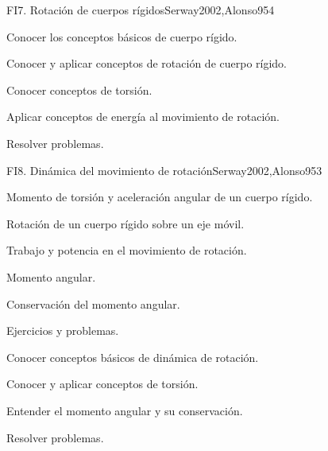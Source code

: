 \begin{sumilla}
\begin{unit}{FI7. Rotaci\'on de cuerpos r\'igidos}{Serway2002,Alonso95}{4}
   \begin{objetivos}
      \item Conocer los conceptos b\'asicos de cuerpo r\'igido.
      \item Conocer y aplicar conceptos de rotaci\'on de cuerpo r\'igido.
      \item Conocer conceptos de torsi\'on.
      \item Aplicar conceptos de energ\'ia al movimiento de rotaci\'on.
      \item Resolver problemas.
   \end{objetivos}
\end{unit}

\begin{unit}{FI8. Din\'amica del movimiento de rotaci\'on}{Serway2002,Alonso95}{3}
\begin{topicos}
      \item Momento de torsi\'on y aceleraci\'on angular de un cuerpo r\'igido.
      \item Rotaci\'on de un cuerpo r\'igido sobre un eje m\'ovil.
      \item Trabajo y potencia en el movimiento de rotaci\'on.
      \item Momento angular.
      \item Conservaci\'on del momento angular.
      \item Ejercicios y problemas.
    \end{topicos}

   \begin{objetivos}
      \item Conocer conceptos b\'asicos de din\'amica de rotaci\'on.
      \item Conocer y aplicar conceptos de torsi\'on.
      \item Entender el momento angular y su conservaci\'on.
      \item Resolver problemas.
   \end{objetivos}
\end{unit}

\begin{bibliografia}
\end{bibliografia}
\end{sumilla}


